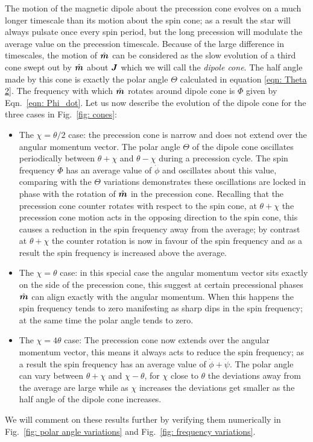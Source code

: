 \documentclass[../full_thesis/full_thesis.tex]{subfiles}
\begin{document}
The motion of the magnetic dipole about the precession cone evolves on a much
longer timescale than its motion about the spin cone; as a result the star will
always pulsate once every spin period, but the long precession will modulate
the average value on the precession timescale. Because of the large difference
in timescales, the motion of $\hat{\boldsymbol{m}}$ can be considered as the slow evolution of a
third cone swept out by $\hat{\boldsymbol{m}}$ about $\boldsymbol{J}$ which we will call the \emph{dipole cone}. The
half angle made by this cone is exactly the polar angle $\Theta$ calculated in
equation \eqref{eqn: Theta 2}. The frequency with which $\hat{\boldsymbol{m}}$ rotates around
dipole cone is $\dot{\Phi}$ given by Eqn.~\eqref{eqn: Phi_dot}. Let us now
describe the evolution of the dipole cone for the three cases in Fig.~\ref{fig: cones}:
\begin{itemize}
\item The $\chi = \theta/2$ case: the precession cone is narrow and does not
extend over the angular momentum vector. The polar angle $\Theta$ of the dipole
cone oscillates periodically between $\theta+\chi$ and $\theta-\chi$
during a precession cycle. The spin frequency $\dot{\Phi}$ has an average value
of $\dot{\phi}$ and
oscillates about this value, comparing with the $\Theta$ variations
demonstrates these oscillations are locked in phase with the rotation of $\hat{\boldsymbol{m}}$
in the precession cone. Recalling that the precession cone counter rotates with
respect to the spin cone, at $\theta+\chi$ the precession cone motion acts in
the opposing direction to the spin cone, this causes a reduction in the spin
frequency away from the average; by contrast at $\theta+\chi$ the counter
rotation is now in favour of the spin frequency and as a result the spin
frequency is increased above the average.

\item The $\chi = \theta$ case: in this special case the angular momentum vector sits exactly
on the side of the precession cone, this suggest at certain precessional phases $\hat{\boldsymbol{m}}$ can align exactly with
the angular momentum. When this happens the spin frequency tends to zero manifesting as sharp dips in the
spin frequency; at the same time the polar angle tends to zero.

\item The $\chi = 4\theta$ case: The precession cone now extends over the
angular momentum vector, this means it always acts to reduce the spin
frequency; as a result the spin frequency has an average value of
$\dot{\phi} + \dot{\psi}$. The polar angle can vary between $\theta+\chi$ and
$\chi-\theta$, for $\chi$ close to $\theta$ the deviations away from the
average are large while as $\chi$ increases the deviations get smaller as
the half angle of the dipole cone increases.
\end{itemize}
We will comment on these results further by verifying them numerically in
Fig.~\ref{fig: polar angle variations} and Fig.~\ref{fig: frequency variations}. 
\end{document}
